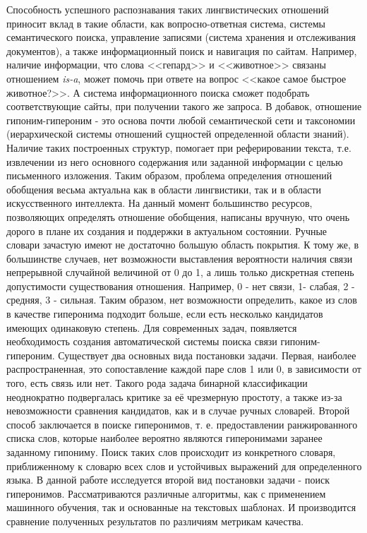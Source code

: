 Способность успешного распознавания таких лингвистических отношений приносит вклад
в такие области, как вопросно-ответная система, системы семантического поиска,
управление записями (система хранения и отслеживания документов), а также
информационный поиск и навигация по сайтам.
Например, наличие информации, что слова <<гепард>> и <<животное>> связаны отношением
\textit{is-a}, может помочь при ответе на вопрос <<какое самое быстрое животное?>>. А система
информационного поиска сможет подобрать соответствующие сайты, при получении
такого же запроса.
В добавок, отношение гипоним-гипероним - это основа почти любой семантической сети и
таксономии (иерархической системы отношений сущностей определенной области
знаний). Наличие таких построенных структур, помогает при реферировании текста, т.е.
извлечении из него основного содержания или заданной информации с целью
письменного изложения.
Таким образом, проблема определения отношений обобщения весьма актуальна как в
области лингвистики, так и в области искусственного интеллекта.
На данный момент большинство ресурсов, позволяющих определять отношение
обобщения, написаны вручную, что очень дорого в плане их создания и поддержки в
актуальном состоянии. Ручные словари зачастую имеют не достаточно большую область
покрытия. К тому же, в большинстве случаев, нет возможности выставления вероятности
наличия связи непрерывной случайной величиной от 0 до 1, а лишь только дискретная
степень допустимости существования отношения. Например, 0 - нет связи, 1- слабая, 2 -
средняя, 3 - сильная. Таким образом, нет возможности определить, какое из слов в
качестве гиперонима подходит больше, если есть несколько кандидатов имеющих
одинаковую степень. Для современных задач, появляется необходимость создания
автоматической системы поиска связи гипоним-гипероним.
Существует два основных вида постановки задачи. Первая, наиболее распространенная,
это сопоставление каждой паре слов 1 или 0, в зависимости от того, есть связь или нет.
Такого рода задача бинарной классификации неоднократно подвергалась критике за её
чрезмерную простоту, а также из-за невозможности сравнения кандидатов, как и в случае
ручных словарей. Второй способ заключается в поиске гиперонимов, т. е. предоставлении
ранжированного списка слов, которые наиболее вероятно являются гиперонимами
заранее заданному гипониму. Поиск таких слов происходит из конкретного словаря,
приближенному к словарю всех слов и устойчивых выражений для определенного языка.
В данной работе исследуется второй вид постановки задачи - поиск гиперонимов.
Рассматриваются различные алгоритмы, как с применением машинного обучения, так и
основанные на текстовых шаблонах. И производится сравнение полученных результатов
по различиям метрикам качества.





